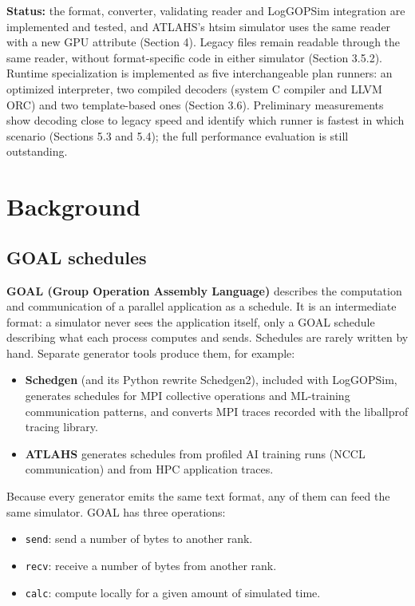 \documentclass[10pt,a4paper]{article}
\begin{document}
\textbf{Status:} the format, converter, validating reader and LogGOPSim integration are implemented and tested, and ATLAHS's htsim simulator uses the same reader with a new GPU attribute (Section 4). Legacy files remain readable through the same reader, without format-specific code in either simulator (Section 3.5.2). Runtime specialization is implemented as five interchangeable plan runners: an optimized interpreter, two compiled decoders (system C compiler and LLVM ORC) and two template-based ones (Section 3.6). Preliminary measurements show decoding close to legacy speed and identify which runner is fastest in which scenario (Sections 5.3 and 5.4); the full performance evaluation is still outstanding.

\hypertarget{background}{}
\section{Background}

\hypertarget{goal-schedules}{}
\subsection{GOAL schedules}

\textbf{GOAL (Group Operation Assembly Language)} describes the computation and communication of a parallel application as a schedule. It is an intermediate format: a simulator never sees the application itself, only a GOAL schedule describing what each process computes and sends. Schedules are rarely written by hand. Separate generator tools produce them, for example:

\begin{itemize}
\item \textbf{Schedgen} (and its Python rewrite Schedgen2), included with LogGOPSim, generates schedules for MPI collective operations and ML-training communication patterns, and converts MPI traces recorded with the liballprof tracing library.
\item \textbf{ATLAHS} generates schedules from profiled AI training runs (NCCL communication) and from HPC application traces.
\end{itemize}

Because every generator emits the same text format, any of them can feed the same simulator. GOAL has three operations:

\begin{itemize}
\item \texttt{send}: send a number of bytes to another rank.
\item \texttt{recv}: receive a number of bytes from another rank.
\item \texttt{calc}: compute locally for a given amount of simulated time.
\end{itemize}
\end{document}
